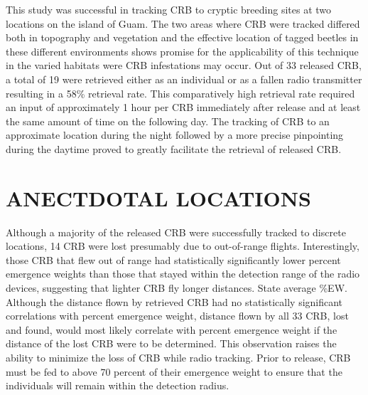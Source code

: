 \documentclass[11pt,letterpaper]{scrartcl}
\begin{document}
This study was successful in tracking CRB to cryptic breeding sites at two locations on the island of Guam.  The two areas where CRB were tracked differed both in topography and vegetation and the effective location of tagged beetles in these different environments shows promise for the applicability of this technique in the varied habitats were CRB infestations may occur. Out of 33 released CRB, a total of 19 were retrieved either as an individual or as a fallen radio transmitter resulting in a 58\% retrieval rate. This comparatively high retrieval rate required an input of approximately 1 hour per CRB immediately after release and at least the same amount of time on the following day. The tracking of CRB to an approximate location during the night followed by a more precise pinpointing during the daytime proved to greatly facilitate the retrieval of released CRB.

\section*{ANECTDOTAL LOCATIONS}

Although a majority of the released CRB were successfully tracked to discrete locations, 14 CRB were lost presumably due to out-of-range flights. Interestingly, those CRB that flew out of range had statistically significantly lower percent emergence weights than those that stayed within the detection range of the radio devices, suggesting that lighter CRB fly longer distances. State average \%EW. Although the distance flown by retrieved CRB had no statistically significant correlations with percent emergence weight, distance flown by all 33 CRB, lost and found, would most likely correlate with percent emergence weight if the distance of the lost CRB were to be determined. This observation raises the ability to minimize the loss of CRB while radio tracking. Prior to release, CRB must be fed to above 70 percent of their emergence weight to ensure that the individuals will remain within the detection radius. 
\end{document}
